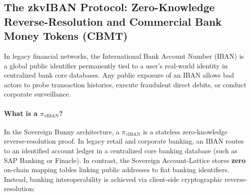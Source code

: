 \documentclass[a4paper,11pt,twoside,parskip=half-,headings=small]{scrartcl}
\begin{document}
\subsection{The zkvIBAN Protocol: Zero-Knowledge Reverse-Resolution and Commercial Bank Money Tokens (CBMT)}
\label{sec:zkviban_protocol}

In legacy financial networks, the International Bank Account Number (IBAN) is a global public identifier permanently tied to a user's real-world identity in centralized bank core databases. Any public exposure of an IBAN allows bad actors to probe transaction histories, execute fraudulent direct debits, or conduct corporate surveillance.

\paragraph{What is a $\pi_{\text{vIBAN}}$?}
In the Sovereign Bunny architecture, a \textbf{$\pi_{\text{vIBAN}}$} is a stateless zero-knowledge reverse-resolution proof. In legacy retail and corporate banking, an IBAN routes to an identified account ledger in a centralized core banking database (such as SAP Banking or Finacle). In contrast, the Sovereign Account-Lattice stores \textbf{zero} on-chain mapping tables linking public addresses to fiat banking identifiers. Instead, banking interoperability is achieved via client-side cryptographic reverse-resolution:
\end{document}
